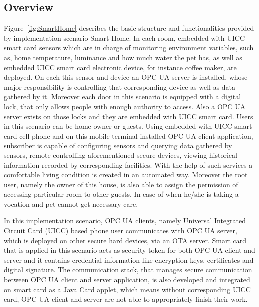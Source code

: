 \documentclass[]{llncs}
\begin{document}
\subsection{Overview}
Figure~\ref{fig:SmartHome} describes the basic structure and functionalities provided by implementation scenario Smart Home.
In each room, embedded with UICC smart card sensors which are in charge of monitoring environment variables, such as, home temperature, luminance and how much water the pet has, as well as embedded UICC smart card electronic device, for instance coffee maker, are deployed. On each this sensor and device an OPC UA server is installed, whose major responsibility is controlling that corresponding device as well as data gathered by it.  Moreover each door in this scenario is equipped with a digital lock, that only allows people with enough authority to access. Also a OPC UA server exists on those locks and they are embedded with UICC smart card. Users in this scenario can be home owner or guests. Using embedded with UICC smart card cell phone and on this mobile terminal installed OPC UA client application, subscriber is capable of configuring sensors and querying data gathered by sensors, remote controlling aforementioned secure devices, viewing historical information recorded by corresponding facilities. With the help of such services a comfortable living condition is created in an automated way.  Moreover the root user, namely the owner of this house, is also able to assign the permission of accessing particular room to other guests. In case of when he/she is taking a vocation and pet cannot get necessary care.


In this implementation scenario, OPC UA clients, namely Universal Integrated Circuit Card (UICC)  based phone user communicates with OPC UA server, which is deployed on other secure hard devices, via an OTA server.   Smart card that is applied in this scenario acts as security token for both OPC UA client and server and it contains credential information like encryption keys. certificates and digital signature. The communication stack, that manages secure  communication between OPC UA client and server application, is also developed and integrated on smart card as a Java Card applet, which means without corresponding UICC card, OPC UA client and server are not able to appropriately finish their work.
\end{document}
